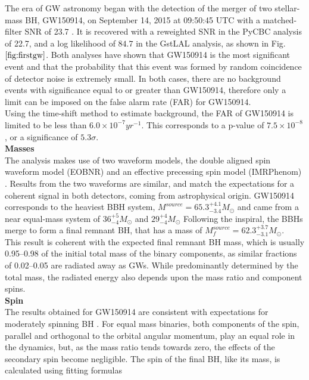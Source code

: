 \documentclass[binding=0.6cm, LaM]{sapthesis}
\begin{document}
	The era of GW astronomy began with the detection of the merger of two stellar-mass BH, GW150914, 
	on September 14, 2015 at 09:50:45 UTC with a matched-filter SNR of 23.7 \cite{21}. 
	It is recovered with a reweighted SNR in the PyCBC analysis of 22.7, 
	and a log likelihood of $84.7$ in the GstLAL analysis, as shown in Fig.$\ref{fig:firstgw}$. 
	Both analyses have shown that GW150914 is the most significant event and that the probability that 
	this event was formed by random coincidence of detector noise is extremely small. 
	In both cases, there are no background events with significance 
	equal to or greater than GW150914, therefore only a limit can be imposed on the false alarm rate (FAR) for GW150914. \\ 
	Using the time-shift method to estimate background, 
	the FAR of GW150914 is limited to be less than $6.0 \times 10^{-7} yr^{-1}$. 
	This corresponds to a p-value of $7.5\times10^{-8}$, or a significance of $5.3\sigma$. \\
	\textbf{Masses} \\ 
	The analysis makes use of two waveform models, the double aligned spin waveform model (EOBNR) \cite{103, 104} 
	and an effective precessing spin model (IMRPhenom) \cite{105-107}. 
	Results from the two waveforms are similar, and match the expectations for a coherent signal in both detectors,
	coming from astrophysical origin. 
	GW150914 corresponds to the heaviest BBH system, $M^{source} = 65.3^{+4.1}_{-3.4}M_\odot$ and came from a near equal-mass system of $36^{+5}_{-4}M_\odot$ and $29^{+4}_{-4}M_\odot$ \cite{21,41,51}
	Following the inspiral, the BBHs merge to form a final remnant BH, that has a mass of $M^{source}_f = 62.3^{+3.7}_{-3.1}M_\odot$. \\
	This result is coherent with the expected final remnant BH mass, which is usually 0.95–0.98 of the initial 
	total mass of the binary components, as similar fractions of 0.02–0.05 are radiated away as GWs. 
	While predominantly determined by the total mass, the radiated energy also 
	depends upon the mass ratio and component spins. \\
	\textbf{Spin} \\
	The results obtained for GW150914 are consistent with expectations for moderately spinning BH \cite{101, 102}. 
	For equal mass binaries, both components of the spin, 
	parallel and orthogonal to the orbital angular momentum, 
	play an equal role in the dynamics, but, as the mass ratio tends towards zero, 
	the effects of the secondary spin become negligible. 
	The spin of the final BH, like its mass, is calculated using fitting formulas 
\end{document}
